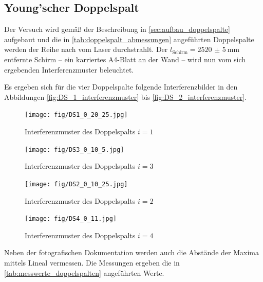\documentclass[ngerman]{scrartcl}
\begin{document}
\subsection{Young'scher Doppelspalt}
\label{sec:durchfuehrung_doppelspalt}

Der Versuch wird gemäß der Beschreibung in \autoref{sec:aufbau_doppelspalte} aufgebaut und die in \autoref{tab:doppelspalt_abmessungen} angeführten Doppelspalte werden der Reihe nach vom Laser durchstrahlt. Der $l_\text{Schirm} = \SI{2520(5)}{\milli\meter}$ entfernte Schirm -- ein karriertes A4-Blatt an der Wand -- wird nun vom sich ergebenden Interferenzmuster beleuchtet.

Es ergeben sich für die vier Doppelspalte folgende Interferenzbilder in den Abbildungen \ref{fig:DS_1_interferenzmuster} bis \ref{fig:DS_2_interferenzmuster}.
%
\setcapindent{0pt}
\begin{figure}[H]
    \centering
    \begin{minipage}[t]{0.45\linewidth}
        \centering
        \texttt{[image: fig/DS1\_0\_20\_25.jpg]}
        \caption{Interferenzmuster des Doppelspalts $i = 1$}
        \label{fig:DS_1_interferenzmuster}
        \texttt{[image: fig/DS3\_0\_10\_5.jpg]}
        \caption{Interferenzmuster des Doppelspalts $i = 3$}
        \label{fig:DS_3_interferenzmuster}
    \end{minipage}%
    \hspace*{\fill}
    \begin{minipage}[t]{0.45\linewidth}
        \centering
        \texttt{[image: fig/DS2\_0\_10\_25.jpg]}
        \caption{Interferenzmuster des Doppelspalts $i = 2$}
        \label{fig:DS_2_interferenzmuster}
        \texttt{[image: fig/DS4\_0\_11.jpg]}
        \caption{Interferenzmuster des Doppelspalts $i = 4$}
        \label{fig:DS_4_interferenzmuster}
    \end{minipage}
\end{figure}
\setcaphanging
%
Neben der fotografischen Dokumentation werden auch die Abstände der Maxima mittels Lineal vermessen. Die Messungen ergeben die in \autoref{tab:messwerte_doppelspalten} angeführten Werte.
\end{document}
